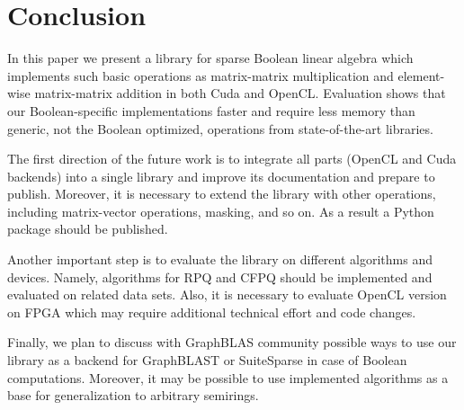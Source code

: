\section{Conclusion}

In this paper we present a library for sparse Boolean linear algebra which implements such basic operations as matrix-matrix multiplication and element-wise matrix-matrix addition in both Cuda and OpenCL.
Evaluation shows that our Boolean-specific implementations faster and require less memory than generic, not the Boolean optimized, operations from state-of-the-art libraries.

The first direction of the future work is to integrate all parts (OpenCL and Cuda backends) into a single library and improve its documentation and prepare to publish.
Moreover, it is necessary to extend the library with other operations, including matrix-vector operations, masking, and so on.
As a result a Python package should be published.

Another important step is to evaluate the library on different algorithms and devices.
Namely, algorithms for RPQ and CFPQ should be implemented and evaluated on related data sets.
Also, it is necessary to evaluate OpenCL version on FPGA which may require additional technical effort and code changes.

Finally, we plan to discuss with GraphBLAS community possible ways to use our library as a backend for GraphBLAST or SuiteSparse in case of Boolean computations.
Moreover, it may be possible to use implemented algorithms as a base for generalization to arbitrary semirings.
